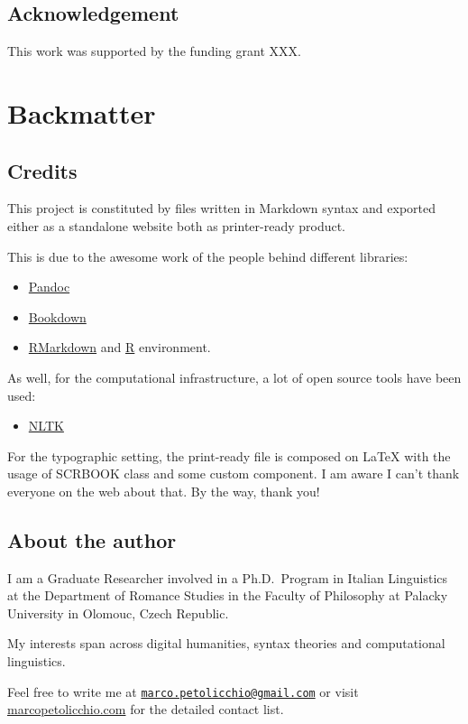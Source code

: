 \documentclass[a4paper,twoside,12pt,chapterprefix=false,bibliography=totocnumbered,listof=flat]{scrbook}
\providecommand{\tightlist}{%
  \setlength{\itemsep}{0pt}\setlength{\parskip}{0pt}}
\theoremstyle{definition}
\theoremstyle{definition}
\theoremstyle{definition}
\theoremstyle{remark}
\begin{document}
\section*{Acknowledgement}\label{acknowledgement}

This work was supported by the funding grant XXX.

\backmatter

\chapter*{Backmatter}\label{backmatter}

\section*{Credits}\label{credits}

This project is constituted by files written in Markdown syntax and
exported either as a standalone website both as printer-ready product.

This is due to the awesome work of the people behind different
libraries:

\begin{itemize}
\tightlist
\item
  \href{https://bookdown.org}{Pandoc}
\item
  \href{https://bookdown.org}{Bookdown}
\item
  \href{https://bookdown.org}{RMarkdown} and
  \href{https://bookdown.org}{R} environment.
\end{itemize}

As well, for the computational infrastructure, a lot of open source
tools have been used:

\begin{itemize}
\tightlist
\item
  \href{https://bookdown.org}{NLTK}
\end{itemize}

For the typographic setting, the print-ready file is composed on LaTeX
with the usage of SCRBOOK class and some custom component. I am aware I
can't thank everyone on the web about that. By the way, thank you!

\section*{About the author}\label{about-the-author}

I am a Graduate Researcher involved in a Ph.D.~Program in Italian
Linguistics at the Department of Romance Studies in the Faculty of
Philosophy at Palacky University in Olomouc, Czech Republic.

My interests span across digital humanities, syntax theories and
computational linguistics.

Feel free to write me at
\href{mailto:marco.petolicchio@gmail.com}{\nolinkurl{marco.petolicchio@gmail.com}}
or visit \href{http://marcopetolicchio.com}{marcopetolicchio.com} for
the detailed contact list.


\end{document}
